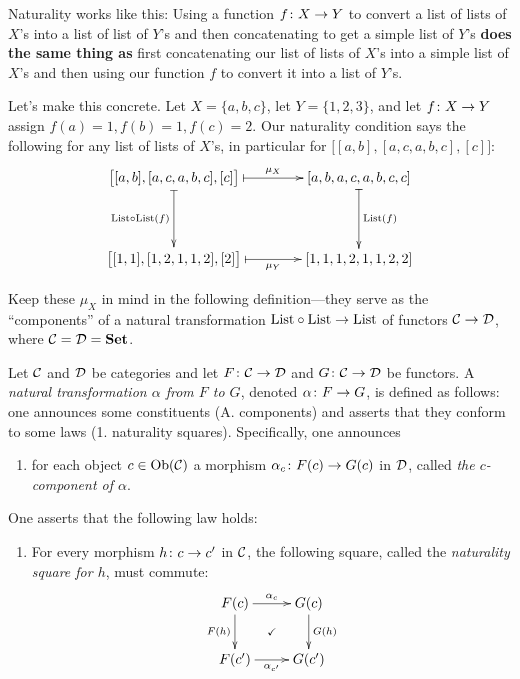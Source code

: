 \documentclass[CT4S-EN-RU]{subfiles}
\begin{document}
\begin{slogan}
Naturality works like this: Using a function $f\colon X\rightarrow Y$ to convert a list of lists of $X$'s into a list of list of $Y$'s and then concatenating to get a simple list of $Y$'s {\bf does the same thing as} first concatenating our list of lists of $X$'s into a simple list of $X$'s and then using our function $f$ to convert it into a list of $Y$'s.
\end{slogan}

Let's make this concrete. Let $X=\{a,b,c\}$, let $Y=\{1,2,3\}$, and let $f\colon X\rightarrow Y$ assign $f(a)=1, f(b)=1, f(c)=2$. Our naturality condition says the following for any list of lists of $X$'s, in particular for $\big[[a,b],[a,c,a,b,c],[c]\big]$:
$$\xymatrix@=40pt{
\big[[a,b],[a,c,a,b,c],[c]\big]\ar@{|->}[r]^-{\mu_X}\ar@{|->}[d]_{\List\circ\List(f)}&[a,b,a,c,a,b,c,c]\ar@{|->}[d]^{\List(f)}\\
\big[[1,1],[1,2,1,1,2],[2]\big]\ar@{|->}[r]_-{\mu_Y}&[1,1,1,2,1,1,2,2]
}
$$

Keep these $\mu_X$ in mind in the following definition—they serve as the “components” of a natural transformation $\textnormal{List}\circ\textnormal{List}\rightarrow\textnormal{List}$ of functors $\mathcal{C}\rightarrow\mathcal{D}$, where $\mathcal{C}=\mathcal{D}={\bf Set}$.

\begin{definition}\label{def:natural transformation}

Let $\mathcal{C}$ and $\mathcal{D}$ be categories and let $F\colon\mathcal{C}\rightarrow\mathcal{D}$ and $G\colon\mathcal{C}\rightarrow\mathcal{D}$ be functors. A {\em natural transformation $\alpha$ from $F$ to $G$}, denoted $\alpha\colon F\rightarrow G$, is defined as follows: one announces some constituents (A. components) and asserts that they conform to some laws (1. naturality squares). Specifically, one announces
\begin{enumerate}[\hsp A.]
\item for each object $c\in\textnormal{Ob}(\mathcal{C})$ a morphism $\alpha_c\colon F(c)\rightarrow G(c)$ in $\mathcal{D}$, called {\em the $c$-component of $\alpha$}.
\end{enumerate}
One asserts that the following law holds:
\begin{enumerate}[\hsp 1.]
\item For every morphism $h\colon c\rightarrow c'$ in $\mathcal{C}$, the following square, called the {\em naturality square for $h$}, must commute:
\begin{align}\label{dia:naturality square}
\xymatrix{F(c)\ar@{}[dr]|{\checkmark}\ar[d]_{F(h)}\ar[r]^{\alpha_c}&G(c)\ar[d]^{G(h)}\\F(c')\ar[r]_{\alpha_{c'}}&G(c')}
\end{align}
\end{enumerate}

\end{definition}
\end{document}
